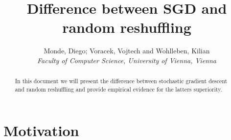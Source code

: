 \documentclass[10pt,conference,compsocconf]{IEEEtran}
\newtheorem{theorem}{Theorem}
\newtheorem{lemma}[theorem]{Lemma}
\begin{document}
\title{Difference between SGD and random reshuffling}

\author{
  Monde, Diego; Voracek, Vojtech and Wohlleben, Kilian\\
  \textit{Faculty of Computer Science, University of Vienna, Vienna}
}

\maketitle

\begin{abstract}
In this document we will present the difference between stochastic gradient descent and random reshuffling and provide empirical evidence for the latters superiority. 
\end{abstract}

\section{Motivation}
\label{sec:motivation}

\medskip
\end{document}
